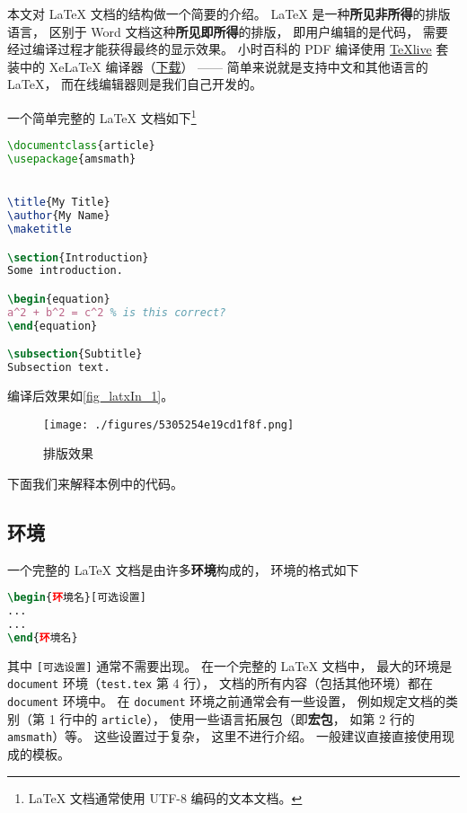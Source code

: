 
本文对 LaTeX 文档的结构做一个简要的介绍。 LaTeX 是一种\textbf{所见非所得}的排版语言， 区别于 Word 文档这种\textbf{所见即所得}的排版， 即用户编辑的是代码， 需要经过编译过程才能获得最终的显示效果。 小时百科的 PDF 编译使用 \href{https://www.tug.org/texlive/}{TeXlive} 套装中的 XeLaTeX 编译器（\href{https://www.tug.org/texlive/acquire-iso.html}{下载}）%
—— 简单来说就是支持中文和其他语言的 LaTeX， 而在线编辑器则是我们自己开发的。

一个简单完整的 LaTeX 文档如下\footnote{LaTeX 文档通常使用 UTF-8 编码的文本文档。}

\begin{lstlisting}[language=latex, caption=test.tex]
\documentclass{article}
\usepackage{amsmath}


\title{My Title}
\author{My Name}
\maketitle

\section{Introduction}
Some introduction.

\begin{equation}
a^2 + b^2 = c^2 % is this correct?
\end{equation}

\subsection{Subtitle}
Subsection text.


\end{lstlisting}

编译后效果如\autoref{fig_latxIn_1}。
\begin{figure}[ht]
\centering
\texttt{[image: ./figures/5305254e19cd1f8f.png]}
\caption{排版效果} \label{fig_latxIn_1}
\end{figure}
下面我们来解释本例中的代码。

\subsection{环境}
一个完整的 LaTeX 文档是由许多\textbf{环境}构成的， 环境的格式如下
\begin{lstlisting}[language=latex]
\begin{环境名}[可选设置]
...
...
\end{环境名}
\end{lstlisting}
其中 \verb|[可选设置]| 通常不需要出现。 在一个完整的 LaTeX 文档中， 最大的环境是 \verb|document| 环境（\verb|test.tex| 第 4 行）， 文档的所有内容（包括其他环境）都在 \verb|document| 环境中。 在 \verb|document| 环境之前通常会有一些设置， 例如规定文档的类别（第 1 行中的 \verb|article|）， 使用一些语言拓展包（即\textbf{宏包}， 如第 2 行的 \verb|amsmath|）等。 这些设置过于复杂， 这里不进行介绍。 一般建议直接直接使用现成的模板。

